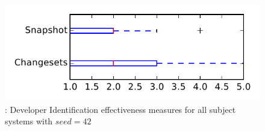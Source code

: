 
\begin{figure}
\centering
\includegraphics[height=0.4\textheight]{figures/dit_seed/rq1_tiny_42}
\caption{\rtwo: Developer Identification effectiveness measures for all subject systems with $seed=42$}
\label{fig:dit_seed:rq1:tiny}
\end{figure}

